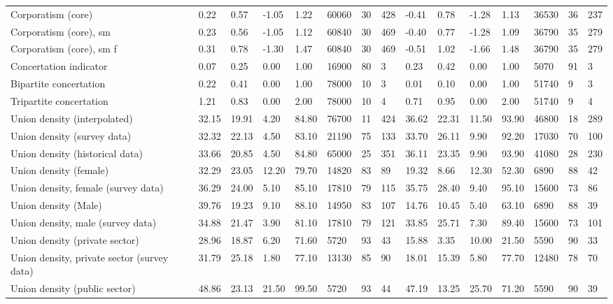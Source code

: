 \begin{longtable}{lllllllllllllll}
Corporatism (core) & 0.22 & 0.57 & -1.05 & 1.22 & 60060 & 30 & 428 & -0.41 & 0.78 & -1.28 & 1.13 & 36530 & 36 & 237\\
\addlinespace
Corporatism (core), sm & 0.23 & 0.56 & -1.05 & 1.12 & 60840 & 30 & 469 & -0.40 & 0.77 & -1.28 & 1.09 & 36790 & 35 & 279\\
Corporatism (core), sm f & 0.31 & 0.78 & -1.30 & 1.47 & 60840 & 30 & 469 & -0.51 & 1.02 & -1.66 & 1.48 & 36790 & 35 & 279\\
Concertation indicator & 0.07 & 0.25 & 0.00 & 1.00 & 16900 & 80 & 3 & 0.23 & 0.42 & 0.00 & 1.00 & 5070 & 91 & 3\\
Bipartite concertation & 0.22 & 0.41 & 0.00 & 1.00 & 78000 & 10 & 3 & 0.01 & 0.10 & 0.00 & 1.00 & 51740 & 9 & 3\\
Tripartite concertation & 1.21 & 0.83 & 0.00 & 2.00 & 78000 & 10 & 4 & 0.71 & 0.95 & 0.00 & 2.00 & 51740 & 9 & 4\\
\addlinespace
Union density (interpolated) & 32.15 & 19.91 & 4.20 & 84.80 & 76700 & 11 & 424 & 36.62 & 22.31 & 11.50 & 93.90 & 46800 & 18 & 289\\
Union density (survey data) & 32.32 & 22.13 & 4.50 & 83.10 & 21190 & 75 & 133 & 33.70 & 26.11 & 9.90 & 92.20 & 17030 & 70 & 100\\
Union density (historical data) & 33.66 & 20.85 & 4.50 & 84.80 & 65000 & 25 & 351 & 36.11 & 23.35 & 9.90 & 93.90 & 41080 & 28 & 230\\
Union density (female) & 32.29 & 23.05 & 12.20 & 79.70 & 14820 & 83 & 89 & 19.32 & 8.66 & 12.30 & 52.30 & 6890 & 88 & 42\\
Union density, female (survey data) & 36.29 & 24.00 & 5.10 & 85.10 & 17810 & 79 & 115 & 35.75 & 28.40 & 9.40 & 95.10 & 15600 & 73 & 86\\
\addlinespace
Union density (Male) & 39.76 & 19.23 & 9.10 & 88.10 & 14950 & 83 & 107 & 14.76 & 10.45 & 5.40 & 63.10 & 6890 & 88 & 39\\
Union density, male (survey data) & 34.88 & 21.47 & 3.90 & 81.10 & 17810 & 79 & 121 & 33.85 & 25.71 & 7.30 & 89.40 & 15600 & 73 & 101\\
Union density (private sector) & 28.96 & 18.87 & 6.20 & 71.60 & 5720 & 93 & 43 & 15.88 & 3.35 & 10.00 & 21.50 & 5590 & 90 & 33\\
Union density, private sector (survey data) & 31.79 & 25.18 & 1.80 & 77.10 & 13130 & 85 & 90 & 18.01 & 15.39 & 5.80 & 77.70 & 12480 & 78 & 70\\
Union density (public sector) & 48.86 & 23.13 & 21.50 & 99.50 & 5720 & 93 & 44 & 47.19 & 13.25 & 25.70 & 71.20 & 5590 & 90 & 39\\

\end{longtable}

